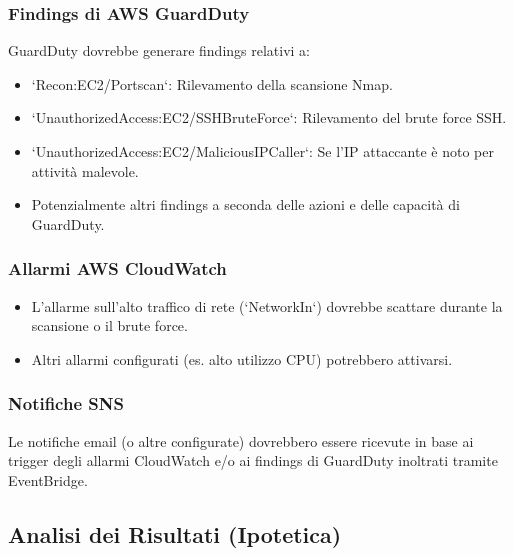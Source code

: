 \documentclass[a4paper,12pt]{report}
\begin{document}
\subsubsection{Findings di AWS GuardDuty}
\label{subsubsec:guardduty_findings_test}
GuardDuty dovrebbe generare findings relativi a:
\begin{itemize}
    \item `Recon:EC2/Portscan`: Rilevamento della scansione Nmap.
    \item `UnauthorizedAccess:EC2/SSHBruteForce`: Rilevamento del brute force SSH.
    \item `UnauthorizedAccess:EC2/MaliciousIPCaller`: Se l'IP attaccante è noto per attività malevole.
    \item Potenzialmente altri findings a seconda delle azioni e delle capacità di GuardDuty.
\end{itemize}

\subsubsection{Allarmi AWS CloudWatch}
\label{subsubsec:cloudwatch_alarms_test}
\begin{itemize}
    \item L'allarme sull'alto traffico di rete (`NetworkIn`) dovrebbe scattare durante la scansione o il brute force.
    \item Altri allarmi configurati (es. alto utilizzo CPU) potrebbero attivarsi.
\end{itemize}

\subsubsection{Notifiche SNS}
\label{subsubsec:sns_notifications_test}
Le notifiche email (o altre configurate) dovrebbero essere ricevute in base ai trigger degli allarmi CloudWatch e/o ai findings di GuardDuty inoltrati tramite EventBridge.

\subsection{Analisi dei Risultati (Ipotetica)}
\label{subsec:analisi_risultati_test}
\end{document}
